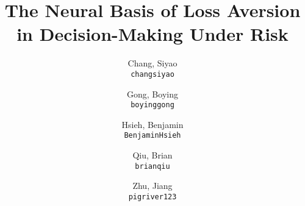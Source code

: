 \documentclass[11pt]{article}
\title{The Neural Basis of Loss Aversion in Decision-Making Under Risk}
\author{
  Chang, Siyao \\
  \texttt{changsiyao}
  \and
  Gong, Boying\\
  \texttt{boyinggong}
  \and
  Hsieh, Benjamin\\
  \texttt{BenjaminHsieh}
  \and
  Qiu, Brian\\
  \texttt{brianqiu}
  \and
  Zhu, Jiang\\
  \texttt{pigriver123}
}
\begin{document}
\maketitle

\abstract{}

















\end{document}
